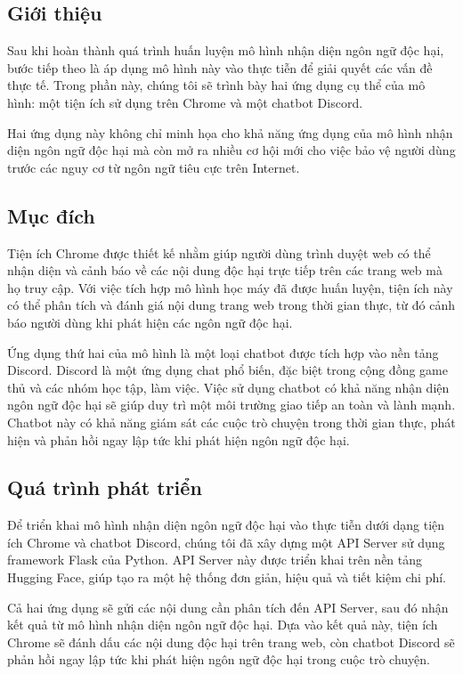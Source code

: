 \subsection{Giới thiệu}
Sau khi hoàn thành quá trình huấn luyện mô hình nhận diện ngôn ngữ độc hại, bước tiếp theo là áp dụng mô hình này vào thực tiễn để giải quyết các vấn đề thực tế. Trong phần này, chúng tôi sẽ trình bày hai ứng dụng cụ thể của mô hình: một tiện ích sử dụng trên Chrome và một chatbot Discord.

Hai ứng dụng này không chỉ minh họa cho khả năng ứng dụng của mô hình nhận diện ngôn ngữ độc hại mà còn mở ra nhiều cơ hội mới cho việc bảo vệ người dùng trước các nguy cơ từ ngôn ngữ tiêu cực trên Internet.

\subsection{Mục đích}

Tiện ích Chrome được thiết kế nhằm giúp người dùng trình duyệt web có thể nhận diện và cảnh báo về các nội dung độc hại trực tiếp trên các trang web mà họ truy cập. Với việc tích hợp mô hình học máy đã được huấn luyện, tiện ích này có thể phân tích và đánh giá nội dung trang web trong thời gian thực, từ đó cảnh báo người dùng khi phát hiện các ngôn ngữ độc hại.

Ứng dụng thứ hai của mô hình là một loại chatbot được tích hợp vào nền tảng Discord. Discord là một ứng dụng chat phổ biến, đặc biệt trong cộng đồng game thủ và các nhóm học tập, làm việc. Việc sử dụng chatbot có khả năng nhận diện ngôn ngữ độc hại sẽ giúp duy trì một môi trường giao tiếp an toàn và lành mạnh. Chatbot này có khả năng giám sát các cuộc trò chuyện trong thời gian thực, phát hiện và phản hồi ngay lập tức khi phát hiện ngôn ngữ độc hại.

\subsection{Quá trình phát triển}
Để triển khai mô hình nhận diện ngôn ngữ độc hại vào thực tiễn dưới dạng tiện ích Chrome và chatbot Discord, chúng tôi đã xây dựng một API Server sử dụng framework Flask của Python. API Server này được triển khai trên nền tảng Hugging Face, giúp tạo ra một hệ thống đơn giản, hiệu quả và tiết kiệm chi phí. 

Cả hai ứng dụng sẽ gửi các nội dung cần phân tích đến API Server, sau đó nhận kết quả từ mô hình nhận diện ngôn ngữ độc hại. Dựa vào kết quả này, tiện ích Chrome sẽ đánh dấu các nội dung độc hại trên trang web, còn chatbot Discord sẽ phản hồi ngay lập tức khi phát hiện ngôn ngữ độc hại trong cuộc trò chuyện.

